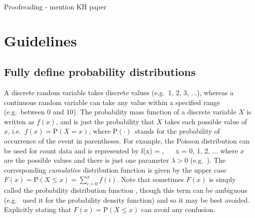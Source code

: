 \begin{frame}
\frametitle{}


\end{frame}



\begin{frame}
\frametitle{}


\end{frame}



\begin{frame}
\frametitle{}


\end{frame}







Proofreading - mention KH paper





\section*{Guidelines}



\subsection*{Fully define probability distributions}

A discrete random variable takes discrete values (e.g.~1, 2, 3, ...), whereas
a continuous random variable can take any value within a specified range
(e.g.~between 0 and 10). The probability mass function of a discrete variable
$X$
is written as $f(x)$, and is just the probability that $X$ takes each possible
value of $x$, i.e.~$f(x) = \mbox{P}(X = x)$, where
P$(\cdot)$~stands for the probability of occurrence of the event in parentheses.
For example, the Poisson distribution can be used for count
data and is represented by
\eb
f(x) = ,
  ~~ x = 0, 1, 2, ...
\label{poisson}
\ee
where $x$ are the possible values and there is just one parameter $\lambda>0$
(e.g.~\citealt{bolk08}). The corresponding \emph{cumulative} distribution
function is given by the upper case
$F(x) = \mbox{P}(X \leq x) = \sum_{i=0}^{x} f(i)$.
Note that sometimes $F(x)$ is simply called the probability distribution
function \citep{gs90}, though this term can be ambiguous (e.g.~\citealt{cw11}
used it for the probability density function) and so it may be best
avoided.
Explicitly stating that
$F(x) = \mbox{P}(X \leq x)$ can avoid any confusion.

